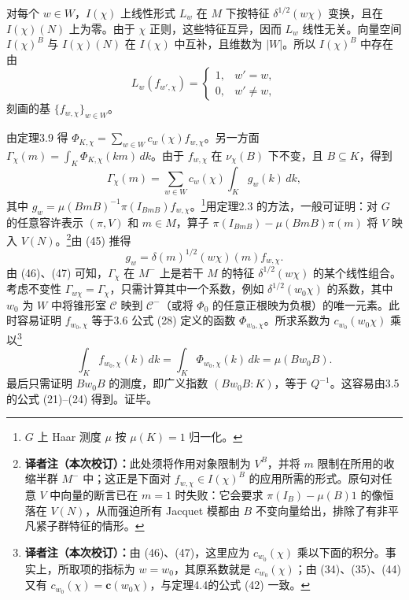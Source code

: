 对每个 $w\in W$，$I(\chi)$ 上线性形式 $L_w$ 在 $M$ 下按特征 $\delta^{1/2}(w\chi)$ 变换，且在 $I(\chi)(N)$ 上为零。由于 $\chi$ 正则，这些特征互异，因而 $L_w$ 线性无关。向量空间 $I(\chi)^B$ 与 $I(\chi)(N)$ 在 $I(\chi)$ 中互补，且维数为 $|W|$。所以 $I(\chi)^B$ 中存在由
\[
L_w(f_{w',\chi})=\begin{cases}1,&w'=w,\\0,&w'\ne w,\end{cases}\tag{45}
\]
刻画的基 $\{f_{w,\chi}\}_{w\in W}$。

由定理3.9 得 $\Phi_{K,\chi}=\sum_{w\in W}c_w(\chi)f_{w,\chi}$。另一方面 $\Gamma_\chi(m)=\int_K\Phi_{K,\chi}(km)\,dk$。由于 $f_{w,\chi}$ 在 $\nu_\chi(B)$ 下不变，且 $B\subseteq K$，得到
\[
\Gamma_\chi(m)=\sum_{w\in W}c_w(\chi)\int_K g_w(k)\,dk,\tag{46}
\]
其中 $g_w=\mu(BmB)^{-1}\pi(I_{BmB})f_{w,\chi}$。\footnote{$G$ 上 Haar 测度 $\mu$ 按 $\mu(K)=1$ 归一化。}用定理2.3 的方法，一般可证明：对 $G$ 的任意容许表示 $(\pi,V)$ 和 $m\in M$，算子 $\pi(I_{BmB})-\mu(BmB)\pi(m)$ 将 $V$ 映入 $V(N)$。\footnote{\textbf{译者注（本次校订）：}此处须将作用对象限制为 $V^B$，并将 $m$ 限制在所用的收缩半群 $M^-$ 中；这正是下面对 $f_{w,\chi}\in I(\chi)^B$ 的应用所需的形式。原句对任意 $V$ 中向量的断言已在 $m=1$ 时失败：它会要求 $\pi(I_B)-\mu(B)1$ 的像恒落在 $V(N)$，从而强迫所有 Jacquet 模都由 $B$ 不变向量给出，排除了有非平凡紧子群特征的情形。}由 (45) 推得
\[
g_w=\delta(m)^{1/2}(w\chi)(m)f_{w,\chi}.\tag{47}
\]
由 (46)、(47) 可知，$\Gamma_\chi$ 在 $M^-$ 上是若干 $M$ 的特征 $\delta^{1/2}(w\chi)$ 的某个线性组合。考虑不变性 $\Gamma_{w\chi}=\Gamma_\chi$，只需计算其中一个系数，例如 $\delta^{1/2}(w_0\chi)$ 的系数，其中 $w_0$ 为 $W$ 中将锥形室 $\mathcal C$ 映到 $\mathcal C^-$（或将 $\Phi_0$ 的任意正根映为负根）的唯一元素。此时容易证明 $f_{w_0,\chi}$ 等于3.6 公式 (28) 定义的函数 $\Phi_{w_0,\chi}$。所求系数为 $c_{w_0}(w_0\chi)$ 乘以\footnote{\textbf{译者注（本次校订）：}由 (46)、(47)，这里应为 $c_{w_0}(\chi)$ 乘以下面的积分。事实上，所取项的指标为 $w=w_0$，其原系数就是 $c_{w_0}(\chi)$；由 (34)、(35)、(44) 又有 $c_{w_0}(\chi)=\mathbf c(w_0\chi)$，与定理4.4的公式 (42) 一致。}
\[
\int_Kf_{w_0,\chi}(k)\,dk=\int_K\Phi_{w_0,\chi}(k)\,dk=\mu(Bw_0B).
\]
最后只需证明 $Bw_0B$ 的测度，即广义指数 $(Bw_0B:K)$，等于 $Q^{-1}$。这容易由3.5 的公式 (21)--(24) 得到。证毕。
